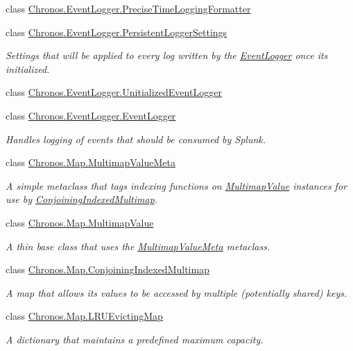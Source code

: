 \begin{DoxyCompactItemize}
class \hyperlink{classChronos_1_1EventLogger_1_1PreciseTimeLoggingFormatter}{Chronos.\+Event\+Logger.\+Precise\+Time\+Logging\+Formatter}
\item 
class \hyperlink{classChronos_1_1EventLogger_1_1PersistentLoggerSettings}{Chronos.\+Event\+Logger.\+Persistent\+Logger\+Settings}
\begin{DoxyCompactList}\small\item\em Settings that will be applied to every log written by the \hyperlink{classChronos_1_1EventLogger_1_1EventLogger}{Event\+Logger} once it\textquotesingle{}s initialized. \end{DoxyCompactList}\item 
class \hyperlink{classChronos_1_1EventLogger_1_1UnitializedEventLogger}{Chronos.\+Event\+Logger.\+Unitialized\+Event\+Logger}
\item 
class \hyperlink{classChronos_1_1EventLogger_1_1EventLogger}{Chronos.\+Event\+Logger.\+Event\+Logger}
\begin{DoxyCompactList}\small\item\em Handles logging of events that should be consumed by Splunk. \end{DoxyCompactList}\item 
class \hyperlink{classChronos_1_1Map_1_1MultimapValueMeta}{Chronos.\+Map.\+Multimap\+Value\+Meta}
\begin{DoxyCompactList}\small\item\em A simple metaclass that tags indexing functions on \hyperlink{classChronos_1_1Map_1_1MultimapValue}{Multimap\+Value} instances for use by \hyperlink{classChronos_1_1Map_1_1ConjoiningIndexedMultimap}{Conjoining\+Indexed\+Multimap}. \end{DoxyCompactList}\item 
class \hyperlink{classChronos_1_1Map_1_1MultimapValue}{Chronos.\+Map.\+Multimap\+Value}
\begin{DoxyCompactList}\small\item\em A thin base class that uses the \hyperlink{classChronos_1_1Map_1_1MultimapValueMeta}{Multimap\+Value\+Meta} metaclass. \end{DoxyCompactList}\item 
class \hyperlink{classChronos_1_1Map_1_1ConjoiningIndexedMultimap}{Chronos.\+Map.\+Conjoining\+Indexed\+Multimap}
\begin{DoxyCompactList}\small\item\em A map that allows its values to be accessed by multiple (potentially shared) keys. \end{DoxyCompactList}\item 
class \hyperlink{classChronos_1_1Map_1_1LRUEvictingMap}{Chronos.\+Map.\+L\+R\+U\+Evicting\+Map}
\begin{DoxyCompactList}\small\item\em A dictionary that maintains a predefined maximum capacity. \end{DoxyCompactList}\end{DoxyCompactItemize}

